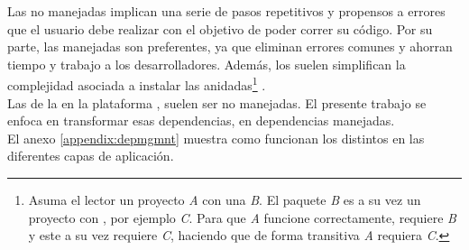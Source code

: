 \jump[2]
Las \dependencies no manejadas implican una serie de pasos repetitivos y 
propensos a errores que el usuario debe realizar con el objetivo de poder 
correr su código. Por su parte, las \dependencies manejadas son preferentes, ya 
que eliminan errores comunes y ahorran tiempo y trabajo a los desarrolladores. 
Además, los \depmgrs suelen simplifican la complejidad asociada a instalar las 
\dependencies anidadas\footnote{
	Asuma el lector un proyecto \emph{A} con una \dependency \emph{B}. El 
	paquete \emph{B} es a su vez un proyecto con \dependencies, por ejemplo 
	\emph{C}. Para que \emph{A} funcione correctamente, requiere \emph{B} y 
	este a su vez requiere \emph{C}, haciendo que de forma transitiva \emph{A} 
	requiera \emph{C}.
} .\\
Las \dependencies de la \viewtier en la plataforma \java, suelen ser no 
manejadas. El presente trabajo se enfoca en transformar esas dependencias, en 
dependencias manejadas.\\
El anexo \ref{appendix:depmgmnt} muestra como funcionan los distintos \depmgrs
en las diferentes capas de aplicación.
